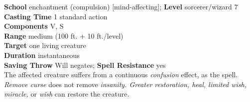 \textbf{School} enchantment (compulsion) [mind-affecting]; \textbf{Level} sorcerer/wizard 7\\
\textbf{Casting Time} 1 standard action\\
\textbf{Components} V, S\\
\textbf{Range }medium (100 ft. + 10 ft./level)\\
\textbf{Target} one living creature\\
\textbf{Duration} instantaneous\\
\textbf{Saving Throw }Will negates; \textbf{Spell Resistance} yes\\
The affected creature suffers from a continuous \textit{confusion }effect, as the spell.\\
\textit{Remove curse} does not remove\textit{ insanity. Greater restoration, heal, limited wish, miracle,} or \textit{wish} can restore the creature.\\

